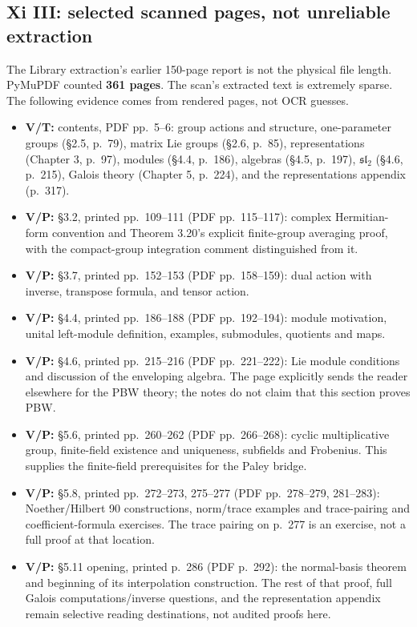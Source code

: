 \documentclass[
  11pt,
]{article}
\providecommand{\tightlist}{%
  \setlength{\itemsep}{0pt}\setlength{\parskip}{0pt}}
\begin{document}
\subsection{Xi III: selected scanned pages, not unreliable
extraction}\label{xi-iii-selected-scanned-pages-not-unreliable-extraction}

The Library extraction's earlier 150-page report is not the physical
file length. PyMuPDF counted \textbf{361 pages}. The scan's extracted
text is extremely sparse. The following evidence comes from rendered
pages, not OCR guesses.

\begin{itemize}
\tightlist
\item
  \textbf{V/T:} contents, PDF pp.~5--6: group actions and structure,
  one-parameter groups (§2.5, p.~79), matrix Lie groups (§2.6, p.~85),
  representations (Chapter 3, p.~97), modules (§4.4, p.~186), algebras
  (§4.5, p.~197), \(\mathfrak{sl}_2\) (§4.6, p.~215), Galois theory
  (Chapter 5, p.~224), and the representations appendix (p.~317).
\item
  \textbf{V/P:} §3.2, printed pp.~109--111 (PDF pp.~115--117): complex
  Hermitian-form convention and Theorem 3.20's explicit finite-group
  averaging proof, with the compact-group integration comment
  distinguished from it.
\item
  \textbf{V/P:} §3.7, printed pp.~152--153 (PDF pp.~158--159): dual
  action with inverse, transpose formula, and tensor action.
\item
  \textbf{V/P:} §4.4, printed pp.~186--188 (PDF pp.~192--194): module
  motivation, unital left-module definition, examples, submodules,
  quotients and maps.
\item
  \textbf{V/P:} §4.6, printed pp.~215--216 (PDF pp.~221--222): Lie
  module conditions and discussion of the enveloping algebra. The page
  explicitly sends the reader elsewhere for the PBW theory; the notes do
  not claim that this section proves PBW.
\item
  \textbf{V/P:} §5.6, printed pp.~260--262 (PDF pp.~266--268): cyclic
  multiplicative group, finite-field existence and uniqueness, subfields
  and Frobenius. This supplies the finite-field prerequisites for the
  Paley bridge.
\item
  \textbf{V/P:} §5.8, printed pp.~272--273, 275--277 (PDF pp.~278--279,
  281--283): Noether/Hilbert 90 constructions, norm/trace examples and
  trace-pairing and coefficient-formula exercises. The trace pairing on
  p.~277 is an exercise, not a full proof at that location.
\item
  \textbf{V/P:} §5.11 opening, printed p.~286 (PDF p.~292): the
  normal-basis theorem and beginning of its interpolation construction.
  The rest of that proof, full Galois computations/inverse questions,
  and the representation appendix remain selective reading destinations,
  not audited proofs here.
\end{itemize}
\end{document}
